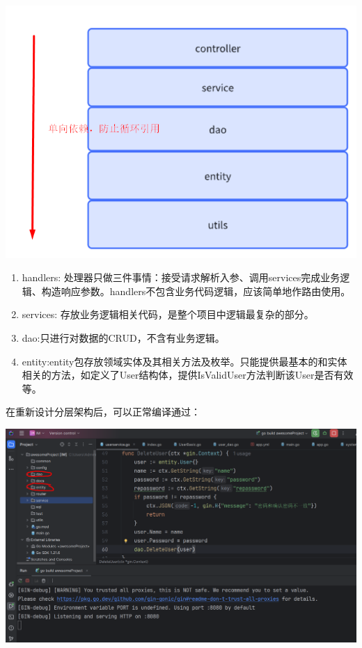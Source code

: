 \documentclass[12pt]{article}
\begin{document}
	\includegraphics[scale=0.7]{7.png}
	
	\begin{enumerate}
		\item handlers: 处理器只做三件事情：接受请求解析入参、调用services完成业务逻辑、构造响应参数。handlers不包含业务代码逻辑，应该简单地作路由使用。
		\item services: 存放业务逻辑相关代码，是整个项目中逻辑最复杂的部分。
		\item dao:只进行对数据的CRUD，不含有业务逻辑。
		\item entity:entity包存放领域实体及其相关方法及枚举。只能提供最基本的和实体相关的方法，如定义了User结构体，提供IsValidUser方法判断该User是否有效等。
	\end{enumerate}
	
	在重新设计分层架构后，可以正常编译通过：
	
	\includegraphics[scale=0.5]{8.png}
	
\end{document}
